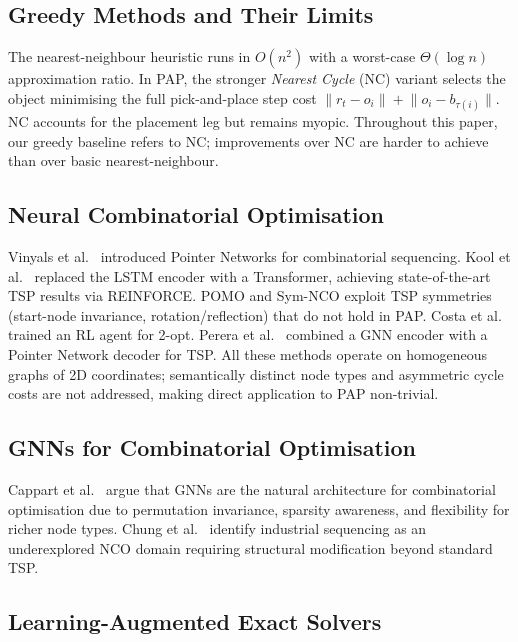 \documentclass[conference]{IEEEtran}
\begin{document}
\subsection{Greedy Methods and Their Limits}

The nearest-neighbour heuristic \cite{rosenkrantz1977} runs in $O(n^2)$ with a worst-case $\Theta(\log n)$ approximation ratio. In PAP, the stronger \emph{Nearest Cycle} (NC) variant selects the object minimising the full pick-and-place step cost $\lVert r_t - o_i \rVert + \lVert o_i - b_{\tau(i)} \rVert$. NC accounts for the placement leg but remains myopic. Throughout this paper, our greedy baseline refers to NC; improvements over NC are harder to achieve than over basic nearest-neighbour.

\subsection{Neural Combinatorial Optimisation}

Vinyals et al.\ \cite{vinyals2015pointer} introduced Pointer Networks for combinatorial sequencing. Kool et al.\ \cite{kool2019attention} replaced the LSTM encoder with a Transformer, achieving state-of-the-art TSP results via REINFORCE. POMO \cite{kwon2020pomo} and Sym-NCO \cite{kim2022symnco} exploit TSP symmetries (start-node invariance, rotation/reflection) that do not hold in PAP. Costa et al.\ \cite{costa2020learning2opt} trained an RL agent for 2-opt. Perera et al.\ \cite{perera2023gpn} combined a GNN encoder with a Pointer Network decoder for TSP. All these methods operate on homogeneous graphs of 2D coordinates; semantically distinct node types and asymmetric cycle costs are not addressed, making direct application to PAP non-trivial.

\subsection{GNNs for Combinatorial Optimisation}

Cappart et al.\ \cite{cappart2023gnnco} argue that GNNs are the natural architecture for combinatorial optimisation due to permutation invariance, sparsity awareness, and flexibility for richer node types. Chung et al.\ \cite{chung2025ncosurvey} identify industrial sequencing as an underexplored NCO domain requiring structural modification beyond standard TSP.

\subsection{Learning-Augmented Exact Solvers}
\end{document}
